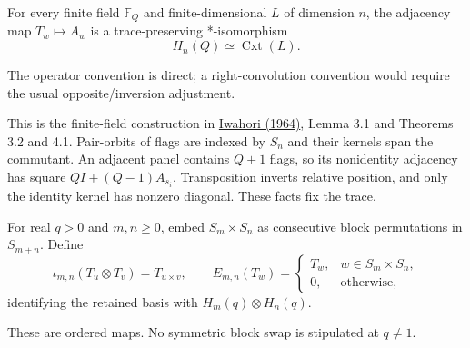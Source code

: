 \begin{theorem}
{\normalfont\statusProved}\quad For every finite field $\mathbb F_Q$
and finite-dimensional $L$ of dimension $n$, the adjacency map
$T_w\mapsto A_w$ is a trace-preserving *-isomorphism
\[
H_n(Q)\simeq\operatorname{Cxt}(L).
\]
\end{theorem}
\begin{scope}The operator convention is direct; a right-convolution
convention would require the usual opposite/inversion adjustment.\end{scope}

This is the finite-field construction in
\href{https://repository.dl.itc.u-tokyo.ac.jp/records/39909}{Iwahori (1964)},
Lemma 3.1 and Theorems 3.2 and 4.1. Pair-orbits of flags are indexed by
$S_n$ and their kernels span the commutant. An adjacent panel contains
$Q+1$ flags, so its nonidentity adjacency has square
$Q I+(Q-1)A_{s_i}$. Transposition inverts relative position, and only
the identity kernel has nonzero diagonal. These facts fix the trace.

\begin{definition}
For real $q>0$ and $m,n\geq0$, embed $S_m\times S_n$ as consecutive block permutations
in $S_{m+n}$. Define
\[
\iota_{m,n}(T_u\otimes T_v)=T_{u\times v},\qquad
E_{m,n}(T_w)=
\begin{cases}T_w,&w\in S_m\times S_n,\\0,&\text{otherwise},\end{cases}
\]
identifying the retained basis with $H_m(q)\otimes H_n(q)$.
\end{definition}
\begin{scope}These are ordered maps. No symmetric block swap is stipulated
at $q\ne1$.\end{scope}

